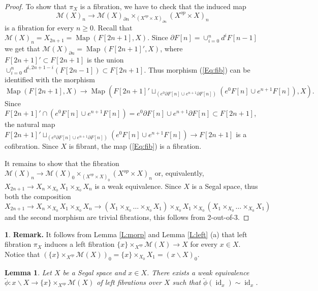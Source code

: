 \documentclass[12pt]{amsart}
\theoremstyle{plain}
\newtheorem{Lem}[Thm]{Lemma}
\theoremstyle{definition}
\newtheorem{Emp}[Thm]{}
\numberwithin{equation}{section}
\newcommand{\cal}[1]{\mathcal{#1}}
\newcommand{\C}[1]{\cal#1}
\newcommand{\form}[1]{(\ref{Eq:#1})}
\newcommand{\wt}{\widetilde}
\newcommand{\bs}{\backslash}
\newcommand{\rl}[1]{Lemma \ref{L:#1}}
\newcommand{\Map}{\operatorname{Map}}
\newcommand{\id}{\operatorname{id}}
\newcommand{\p}{\partial}
\begin{document}
\begin{proof}
To show that $\pi_X$ is a fibration, we have to check that the
induced map
%
\begin{equation} \label{Eq:fib}
\C{M}(X)_n\to\C{M}(X)_{\p n}\times_{(X^{op}\times X)_{\p
n}}(X^{op}\times X)_n
\end{equation}
%
is a fibration for every $n\geq 0$. Recall that
$\C{M}(X)_n=X_{2n+1}=\Map(F[2n+1],X)$. Since $\p
F[n]=\cup_{i=0}^nd^iF[n-1]$ we get that $\C{M}(X)_{\p
n}=\Map(F[2n+1]',X)$, where $F[2n+1]'\subset F[2n+1]$ is the union
$\cup_{i=0}^n d^{i,2n+1-i}(F[2n-1])\subset F[2n+1]$. Thus morphism
\form{fib} can be identified with the morphism
\[
\Map(F[2n+1],X)\to \Map(F[2n+1]'\sqcup_{(e^0\partial F[n]\cup
e^{n+1} \p F[n])}(e^0 F[n]\cup e^{n+1} F[n]),X).
\]
Since $F[2n+1]'\cap(e^0 F[n]\cup e^{n+1} F[n])=e^0\partial
F[n]\cup e^{n+1}\p F[n]\subset F[2n+1]$, the natural map
$F[2n+1]'\sqcup_{(e^0\partial F[n]\cup e^{n+1} \p F[n])}(e^0
F[n]\cup e^{n+1} F[n])\to F[2n+1]$ 
is a cofibration. Since $X$ is fibrant, the map \form{fib} is a
fibration.

It remains to show that the fibration $\C{M}(X)_n\to
\C{M}(X)_0\times_{(X^{op}\times X)_0}(X^{op}\times X)_n$ or,
equivalently, $X_{2n+1}\to X_n\times_{X_0}X_1\times_{X_0} X_n$ is
a weak equivalence. Since $X$ is a Segal space, thus both the
composition
\[
X_{2n+1}\to X_n\times_{X_0}X_1\times_{X_0} X_n\to
(X_1\times_{X_0}\ldots\times_{X_0} X_1)
\times_{X_0}X_1\times_{X_0}(X_1\times_{X_0}\ldots\times_{X_0} X_1)
\]
and the second morphism are trivial fibrations, this 
follows from 2-out-of-3.
\end{proof}

\begin{Emp} \label{E:rem}
{\bf Remark.} It follows from \rl{morp} and \rl{left} (a) that
left fibration $\pi_X$ induces a left fibration
$\{x\}\times_{X^{op}}\C{M}(X)\to X$ for every $x\in X$. Notice that
$(\{x\}\times_{X^{op}}\C{M}(X))_0=\{x\}\times_{X_0}X_1=(x\bs X)_0$.
\end{Emp}


\begin{Lem} \label{L:we}
Let $X$ be a Segal space and $x\in X$. There exists a weak
equivalence $\wt{\phi}:x\bs X\to \{x\}\times_{X^{op}}\C{M}(X)$ of 
left fibrations over $X$ such that $\wt{\phi}(\id_x)\sim\id_x$.
\end{Lem}
\end{document}
